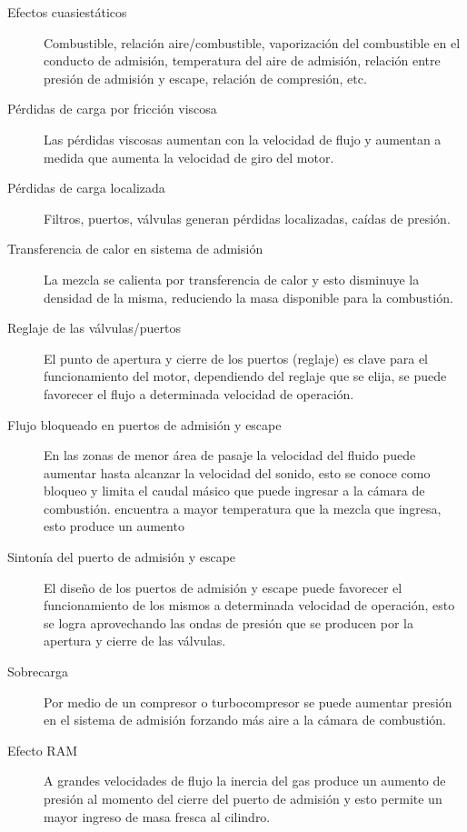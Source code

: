 \begin{description}
    \item [Efectos cuasiestáticos] Combustible, relación aire/combustible,
vaporización del combustible en el conducto de admisión, temperatura del aire de
admisión, relación entre presión de admisión y escape, relación de compresión,
etc.
  \item [Pérdidas de carga por fricción viscosa] Las pérdidas viscosas aumentan
con la velocidad de flujo y aumentan a medida que aumenta la velocidad de giro
del motor.
  \item [Pérdidas de carga localizada] Filtros, puertos, válvulas generan
pérdidas localizadas, caídas de presión.
  \item [Transferencia de calor en sistema de admisión] La mezcla se calienta
por transferencia de calor y esto disminuye la densidad de la misma, reduciendo
la masa disponible para la combustión.
  \item [Reglaje de las válvulas/puertos] El punto de apertura y cierre de los
puertos (reglaje) es clave para el funcionamiento del motor, dependiendo del
reglaje que se elija, se puede favorecer el flujo a determinada velocidad de
operación.
    \item [Flujo bloqueado en puertos de admisión y escape] En las zonas de
menor área de pasaje la velocidad del fluido puede aumentar hasta alcanzar la
velocidad del sonido, esto se conoce como bloqueo y limita el caudal másico que
puede ingresar a la cámara de combustión.
encuentra a mayor temperatura que la mezcla que ingresa, esto produce un aumento
    \item [Sintonía del puerto de admisión y escape] El diseño de los puertos de
admisión y escape puede favorecer el funcionamiento de los mismos a determinada
velocidad de operación, esto se logra aprovechando las ondas de presión que se
producen por la apertura y cierre de las válvulas.
  \item [Sobrecarga] Por medio de un compresor o turbocompresor se puede
aumentar presión en el sistema de admisión forzando más aire a la cámara de
combustión.
    \item [Efecto RAM] A grandes velocidades de flujo la inercia del gas produce
un aumento de presión al momento del cierre del puerto de admisión y esto
permite un mayor ingreso de masa fresca al cilindro.
\end{description}

